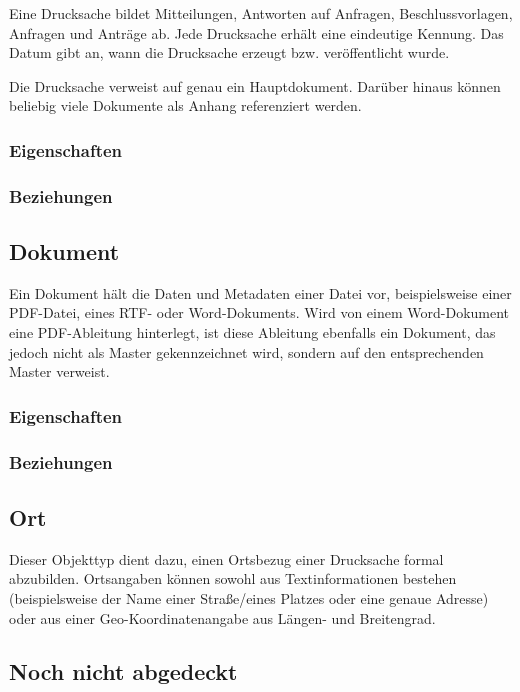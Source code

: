 Eine Drucksache bildet Mitteilungen, Antworten auf Anfragen,
Beschlussvorlagen, Anfragen und Anträge ab. Jede Drucksache erhält eine
eindeutige Kennung. Das Datum gibt an, wann die Drucksache erzeugt bzw.
veröffentlicht wurde.

Die Drucksache verweist auf genau ein Hauptdokument. Darüber hinaus
können beliebig viele Dokumente als Anhang referenziert werden.

\subsubsection{Eigenschaften}

\subsubsection{Beziehungen}

\subsection{Dokument}

Ein Dokument hält die Daten und Metadaten einer Datei vor,
beispielsweise einer PDF-Datei, eines RTF- oder Word-Dokuments. Wird von
einem Word-Dokument eine PDF-Ableitung hinterlegt, ist diese Ableitung
ebenfalls ein Dokument, das jedoch nicht als Master gekennzeichnet wird,
sondern auf den entsprechenden Master verweist.

\subsubsection{Eigenschaften}

\subsubsection{Beziehungen}

\subsection{Ort}

Dieser Objekttyp dient dazu, einen Ortsbezug einer Drucksache formal
abzubilden. Ortsangaben können sowohl aus Textinformationen bestehen
(beispielsweise der Name einer Straße/eines Platzes oder eine genaue
Adresse) oder aus einer Geo-Koordinatenangabe aus Längen- und
Breitengrad.

\subsection{Noch nicht abgedeckt}

